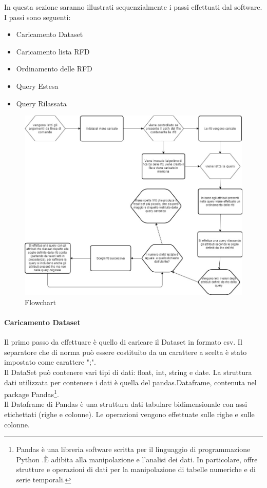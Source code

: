 In questa sezione saranno illustrati sequenzialmente i passi effettuati dal software. I passi sono  seguenti:
\begin{itemize}[noitemsep]
    \item Caricamento Dataset
    \item Caricamento lista RFD
    \item Ordinamento delle RFD
    \item Query Estesa
    \item Query Rilassata
\end{itemize}
\begin{figure}[H]
\centering
\includegraphics[width=\textwidth,height=\textheight,keepaspectratio]{images/Flowchart.jpg}
\caption{Flowchart}\label{fig:4}
\end{figure}
\paragraph{Caricamento Dataset}
Il primo passo da effettuare è quello di caricare il Dataset in formato csv. Il separatore che di norma può essere costituito da un carattere a scelta è stato impostato come carattere ";".\\ Il DataSet può contenere vari tipi di dati: float, int, string e date.
La struttura dati utilizzata per contenere i dati è quella del pandas.Dataframe, contenuta nel package Pandas\footnote{Pandas è una libreria software scritta per il linguaggio di programmazione Python .È adibita alla manipolazione e l'analisi dei dati. In particolare, offre strutture e operazioni di dati per la manipolazione di tabelle numeriche e di serie temporali. }. \\Il Dataframe di Pandas è una struttura dati tabulare bidimensionale con assi etichettati (righe e colonne). Le operazioni vengono effettuate sulle righe e sulle colonne. 
